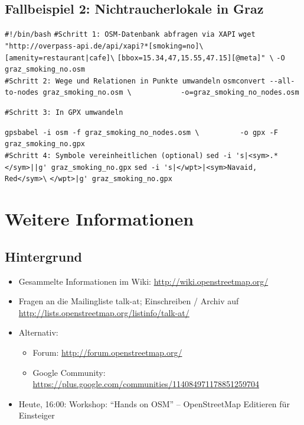 \documentclass{beamer}
\begin{document}
\subsection{Fallbeispiel 2: Nichtraucherlokale in Graz}
\begin{frame}[fragile]

\verb+#!/bin/bash+
\verb+#Schritt 1: OSM-Datenbank abfragen via XAPI+
\verb+wget "http://overpass-api.de/api/xapi?*[smoking=no]\+
\verb+[amenity=restaurant|cafe]\+
\verb+[bbox=15.34,47,15.55,47.15][@meta]" \+
\verb+-O graz_smoking_no.osm+
\\
\verb+#Schritt 2: Wege und Relationen in Punkte umwandeln+
\verb+osmconvert --all-to-nodes graz_smoking_no.osm \+
\verb+           -o=graz_smoking_no_nodes.osm+
\end{frame}
\begin{frame}[fragile]


\verb+#Schritt 3: In GPX umwandeln +

\verb+gpsbabel -i osm -f graz_smoking_no_nodes.osm \+
\verb+         -o gpx -F graz_smoking_no.gpx+
\\
\verb+#Schritt 4: Symbole vereinheitlichen (optional)+
\verb+sed -i 's|<sym>.*</sym>||g' graz_smoking_no.gpx+
\verb+sed -i 's|</wpt>|<sym>Navaid, Red</sym>\+
\verb+</wpt>|g' graz_smoking_no.gpx+
\end{frame}

\section{Weitere Informationen}

\subsection{Hintergrund}
\begin{frame}
\begin{itemize}
  \item Gesammelte Informationen im Wiki:
    \url{http://wiki.openstreetmap.org/}
  \item Fragen an die Mailingliste talk-at; Einschreiben / Archiv auf \url{http://lists.openstreetmap.org/listinfo/talk-at/}
  \item Alternativ:
  \begin{itemize}
    \item Forum: \url{http://forum.openstreetmap.org/}
    \item Google Community: \url{https://plus.google.com/communities/114084971178851259704}
  \end{itemize}
  \item Heute, 16:00: Workshop: ``Hands on OSM'' -- OpenStreetMap Editieren für Einsteiger 
\end{itemize}
\end{frame}
\end{document}
